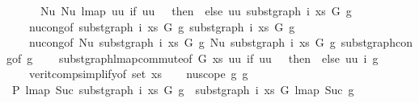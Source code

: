 \begin{isabellebody}
\ \ \ \ \ \ {\isachardoublequoteopen}Nu\ {\isacharparenleft}{\kern0pt}Nu\ {\isacharparenleft}{\kern0pt}lmap\ {\isacharparenleft}{\kern0pt}{\isasymlambda}uu{\isachardot}{\kern0pt}\ if\ uu\ {\isacharequal}{\kern0pt}\ {}\ then\ {}\ else\ uu{\isacharparenright}{\kern0pt}\ {\isacharparenleft}{\kern0pt}subst{\isacharunderscore}{\kern0pt}graph\ i\ xs\ G{}\ g{\isacharparenright}{\kern0pt}{\isacharparenright}{\kern0pt}{\isacharparenright}{\kern0pt}{\isachardoublequoteclose}{\isacharbrackright}{\kern0pt}\isanewline
\ \ \ \ nu{\isacharunderscore}{\kern0pt}cong{\isacharbrackleft}{\kern0pt}of\ {\isachardoublequoteopen}subst{\isacharunderscore}{\kern0pt}graph\ i\ xs\ G{}\ g{\isachardoublequoteclose}\ {\isachardoublequoteopen}subst{\isacharunderscore}{\kern0pt}graph\ i\ xs\ G{}\ g{\isachardoublequoteclose}{\isacharbrackright}{\kern0pt}\isanewline
\ \ \ \ nu{\isacharunderscore}{\kern0pt}cong{\isacharbrackleft}{\kern0pt}of\ {\isachardoublequoteopen}Nu\ {\isacharparenleft}{\kern0pt}subst{\isacharunderscore}{\kern0pt}graph\ i\ xs\ G{}\ g{\isacharparenright}{\kern0pt}{\isachardoublequoteclose}\ {\isachardoublequoteopen}Nu\ {\isacharparenleft}{\kern0pt}subst{\isacharunderscore}{\kern0pt}graph\ i\ xs\ G{}\ g{\isacharparenright}{\kern0pt}{\isachardoublequoteclose}{\isacharbrackright}{\kern0pt}\ subst{\isacharunderscore}{\kern0pt}graph{\isacharunderscore}{\kern0pt}cong{}{\isacharbrackleft}{\kern0pt}of\ g{\isacharbrackright}{\kern0pt}\isanewline
\ \ \ \ subst{\isacharunderscore}{\kern0pt}graph{\isacharunderscore}{\kern0pt}lmap{\isacharunderscore}{\kern0pt}commute{\isacharbrackleft}{\kern0pt}of\ G{}\ xs\ {\isachardoublequoteopen}{\isasymlambda}uu{\isachardot}{\kern0pt}\ if\ uu\ {\isacharequal}{\kern0pt}\ {}\ then\ {}\ else\ uu{\isachardoublequoteclose}\ i\ g{\isacharbrackright}{\kern0pt}\isanewline
\ \ \ \ verit{\isacharunderscore}{\kern0pt}comp{\isacharunderscore}{\kern0pt}simplify{}{\isacharparenleft}{\kern0pt}{}{\isacharparenright}{\kern0pt}{\isacharbrackleft}{\kern0pt}of\ {\isachardoublequoteopen}set\ xs{\isachardoublequoteclose}{\isacharbrackright}{\kern0pt}{\isacharparenright}{\kern0pt}\isanewline
{}\isamarkupfalse%
\isanewline
\ \ \isamarkupfalse%
\ {\isacharparenleft}{\kern0pt}nu{\isacharunderscore}{\kern0pt}scope\ g{}\ g{}{\isacharparenright}{\kern0pt}\isanewline
\ \ \isamarkupfalse%
\ P{}{\isacharcolon}{\kern0pt}\ {\isachardoublequoteopen}lmap\ Suc\ {\isacharparenleft}{\kern0pt}subst{\isacharunderscore}{\kern0pt}graph\ i\ xs\ G{}\ g{}{\isacharparenright}{\kern0pt}\ {\isasymsimeq}\ subst{\isacharunderscore}{\kern0pt}graph\ i\ xs\ G{}\ {\isacharparenleft}{\kern0pt}lmap\ Suc\ g{}{\isacharparenright}{\kern0pt}{\isachardoublequoteclose}\isanewline

\end{isabellebody}
